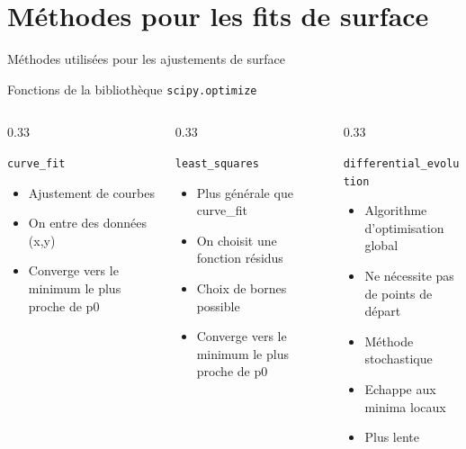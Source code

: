 \documentclass[10pt, aspectratio=169]{beamer}
\begin{document}
\section{Méthodes pour les fits de surface}

\begin{frame}[fragile]{Méthodes utilisées pour les ajustements de surface}
  
  \begin{center}
    Fonctions de la bibliothèque \texttt{scipy.optimize}
  \end{center}

  \begin{columns}[T]
    \begin{column}{0.33\textwidth\small}
      \begin{block}{\texttt{curve\_fit}}
        \begin{itemize}
          \item Ajustement de courbes 
          \item On entre des données (x,y)
          \item Converge vers le minimum le plus proche de p0
        \end{itemize}
        
      \end{block}
    \end{column}

    \begin{column}{0.33\textwidth\small}
      \begin{exampleblock}{\texttt{least\_squares}}
        \begin{itemize}
          \item Plus générale que curve\_fit
          \item On choisit une fonction résidus
          \item Choix de bornes possible
          \item Converge vers le minimum le plus proche de p0
        \end{itemize}
        
      \end{exampleblock}
    \end{column}

    \begin{column}{0.33\textwidth\small}
      \begin{block}{\texttt{differential\_evolution}}
       \begin{itemize}
          \item Algorithme d'optimisation global 
          \item Ne nécessite pas de points de départ
          \item Méthode stochastique
          \item Echappe aux minima locaux
          \item Plus lente


\end{itemize}
\end{block}
\end{column}
\end{columns}
\end{frame}
\end{document}
